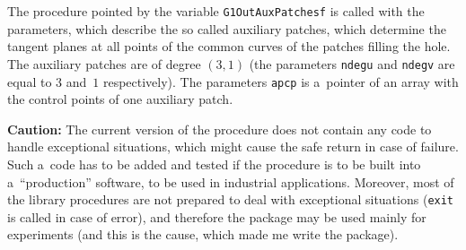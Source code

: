 The procedure pointed by the variable \texttt{G1OutAuxPatchesf} is
called with the parameters, which describe the so called auxiliary patches,
which determine the tangent planes at all points of the common curves
of the patches filling the hole. The auxiliary patches are of degree
$(3,1)$ (the parameters \texttt{ndegu} and \texttt{ndegv} are equal to
$3$ and~$1$ respectively). The parameters \texttt{apcp} is a~pointer of
an array with the control points of one auxiliary patch.

\vspace{\medskipamount}
\noindent\textbf{Caution:}
The current version of the procedure does not contain any code to handle
exceptional situations, which might cause the safe return in case of
failure. Such a~code has to be added and tested if the procedure is to be
built into a~``production'' software, to be used in industrial applications.
Moreover, most of the library procedures are not prepared to deal with
exceptional situations (\texttt{exit} is called in case of error),
and therefore the package may be used mainly for experiments
(and this is the cause, which made me write the package).
